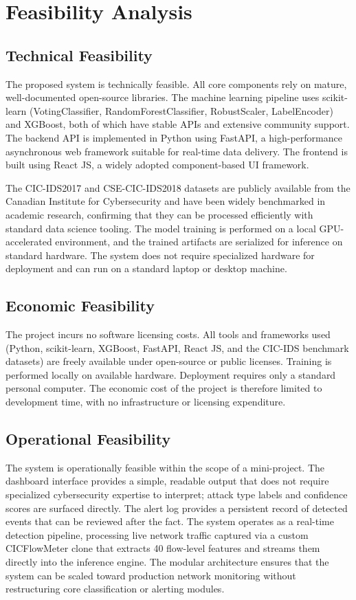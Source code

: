 \documentclass[12pt,a4paper]{report}
\begin{document}
\section{Feasibility Analysis}

\subsection{Technical Feasibility}

The proposed system is technically feasible. All core components rely on mature, well-documented open-source libraries. The machine learning pipeline uses scikit-learn (VotingClassifier, RandomForestClassifier, RobustScaler, LabelEncoder) and XGBoost, both of which have stable APIs and extensive community support. The backend API is implemented in Python using FastAPI, a high-performance asynchronous web framework suitable for real-time data delivery. The frontend is built using React JS, a widely adopted component-based UI framework.

The CIC-IDS2017 and CSE-CIC-IDS2018 datasets are publicly available from the Canadian Institute for Cybersecurity and have been widely benchmarked in academic research, confirming that they can be processed efficiently with standard data science tooling. The model training is performed on a local GPU-accelerated environment, and the trained artifacts are serialized for inference on standard hardware. The system does not require specialized hardware for deployment and can run on a standard laptop or desktop machine.

\subsection{Economic Feasibility}

The project incurs no software licensing costs. All tools and frameworks used (Python, scikit-learn, XGBoost, FastAPI, React JS, and the CIC-IDS benchmark datasets) are freely available under open-source or public licenses. Training is performed locally on available hardware. Deployment requires only a standard personal computer. The economic cost of the project is therefore limited to development time, with no infrastructure or licensing expenditure.

\subsection{Operational Feasibility}

The system is operationally feasible within the scope of a mini-project. The dashboard interface provides a simple, readable output that does not require specialized cybersecurity expertise to interpret; attack type labels and confidence scores are surfaced directly. The alert log provides a persistent record of detected events that can be reviewed after the fact. The system operates as a real-time detection pipeline, processing live network traffic captured via a custom CICFlowMeter clone that extracts 40 flow-level features and streams them directly into the inference engine. The modular architecture ensures that the system can be scaled toward production network monitoring without restructuring core classification or alerting modules.
\end{document}
